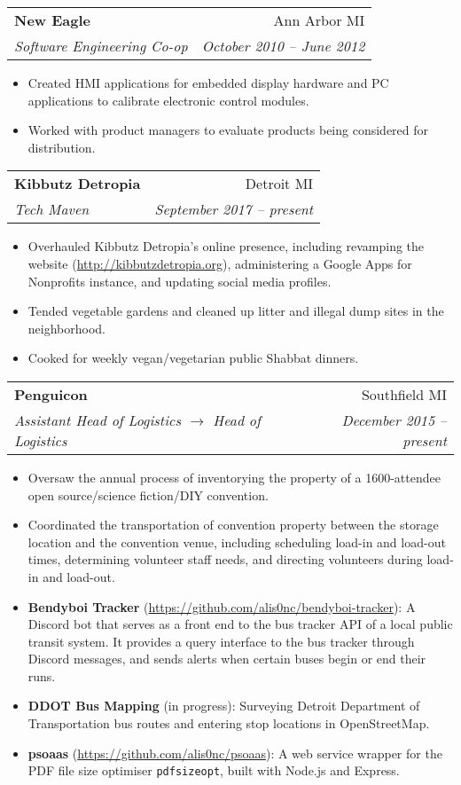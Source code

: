 \documentclass[letterpaper,10pt]{article}
\makeatletter
\newlength{\listsep}
\newcommand{\resitem}[1]{\item #1 \vspace{-2pt}}
\newcommand{\resheading}[1]{\vspace{4pt}
  \parbox{\textwidth}{
      \framebox[\textwidth][l]{
          {\textbf{\sffamily{\large #1}}}
      }
  }
}
\newcommand{\ressubheading}[4]{
\begin{tabular*}{\textwidth}{l@{\cftdotfill{\cftsecdotsep}\extracolsep{\fill}}r}
        \textbf{#1} & #2 \\
        \textit{#3} & \textit{#4} \\
\end{tabular*}\vspace{-6pt}}
\makeatother
\begin{document}
\ressubheading{New Eagle}{Ann Arbor MI}{Software Engineering Co-op}{October 2010 -- June 2012}
\begin{itemize}\itemsep \listsep \small
    \resitem{Created HMI applications for embedded display hardware and PC applications to calibrate electronic control modules.}
    \resitem{Worked with product managers to evaluate products being considered for distribution.}
\end{itemize}

\resheading{Volunteer Experience}

\ressubheading{Kibbutz Detropia}{Detroit MI}{Tech Maven}{September 2017 -- present}
\begin{itemize} \itemsep \listsep \small
	\resitem{Overhauled Kibbutz Detropia's online presence, including revamping the website (\url{http://kibbutzdetropia.org}), administering a Google Apps for Nonprofits instance, and updating social media profiles.}
	\resitem{Tended vegetable gardens and cleaned up litter and illegal dump sites in the neighborhood.}
	\resitem{Cooked for weekly vegan/vegetarian public Shabbat dinners.}
\end{itemize}

\ressubheading{Penguicon}{Southfield MI}{Assistant Head of Logistics $\rightarrow$ Head of Logistics}{December 2015 -- present}
\begin{itemize} \itemsep \listsep \small
	\resitem{Oversaw the annual process of inventorying the property of a 1600-attendee open source/science fiction/DIY convention.}
	\resitem{Coordinated the transportation of convention property between the storage location and the convention venue, including scheduling load-in and load-out times, determining volunteer staff needs, and directing volunteers during load-in and load-out.}
\end{itemize}

\ifdef{\SHALEM}{\def\PROJECTS{}}{}

\resheading{Projects}

\vspace{-0.5\baselineskip}
\begin{itemize} \listsep
	\item {\bf Bendyboi Tracker} (\url{https://github.com/alis0nc/bendyboi-tracker}): A Discord bot that serves as a front end to the bus tracker API of a local public transit system. It provides a query interface to the bus tracker through Discord messages, and sends alerts when certain buses begin or end their runs.
    \item {\bf DDOT Bus Mapping} (in progress): Surveying Detroit Department of Transportation bus routes and entering stop locations in OpenStreetMap.
    \item {\bf psoaas} (\url{https://github.com/alis0nc/psoaas}): A web service wrapper for the PDF file size optimiser \texttt{pdfsizeopt}, built with Node.js and Express.
    
\end{itemize}
\end{document}
